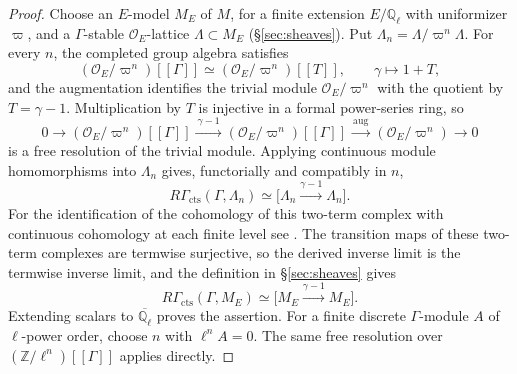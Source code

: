 \documentclass[12pt,reqno]{amsart}
\theoremstyle{definition}
\theoremstyle{plain}
\theoremstyle{definition}
\theoremstyle{remark}
\newcommand{\bbQ}{\mathbb{Q}}  \newcommand{\bbR}{\mathbb{R}}
\newcommand{\ol}[1]{\overline{#1}}
\newcommand{\Ql}{\bbQ_{\ell}}
\begin{document}
\begin{proof}
Choose an \(E\)-model \(M_E\) of \(M\), for a finite extension \(E/\mathbb Q_\ell\) with
uniformizer \(\varpi\), and a \(\Gamma\)-stable \(\mathcal O_E\)-lattice \(\Lambda\subset M_E\)
(\S\ref{sec:sheaves}).  Put \(\Lambda_n=\Lambda/\varpi^n\Lambda\).  For every \(n\), the completed
group algebra satisfies
\[
        (\mathcal O_E/\varpi^n)[[\Gamma]]\simeq(\mathcal O_E/\varpi^n)[[T]],
        \qquad \gamma\longmapsto1+T,
\]
and the augmentation identifies the trivial module \(\mathcal O_E/\varpi^n\) with the quotient by
\(T=\gamma-1\).  Multiplication by \(T\) is injective in a formal power-series ring, so
\[
 0\longrightarrow(\mathcal O_E/\varpi^n)[[\Gamma]]
 \xrightarrow{\ \gamma-1\ }(\mathcal O_E/\varpi^n)[[\Gamma]]
 \xrightarrow{\ \mathrm{aug}\ }(\mathcal O_E/\varpi^n)\longrightarrow0
\]
is a free resolution of the trivial module.  Applying continuous module homomorphisms into
\(\Lambda_n\) gives, functorially and compatibly in \(n\),
\[
        R\Gamma_{\mathrm{cts}}(\Gamma,\Lambda_n)
        \simeq
        \bigl[\Lambda_n\xrightarrow{\gamma-1}\Lambda_n\bigr].
\]
For the identification of the cohomology of this two-term complex with continuous cohomology at each
finite level see \cite[Prop.~1.7.7]{NSW2008}.
The transition maps of these two-term complexes are termwise surjective, so the derived inverse
limit is the termwise inverse limit, and the definition in \S\ref{sec:sheaves} gives
\[
        R\Gamma_{\mathrm{cts}}(\Gamma,M_E)
        \simeq
        \bigl[M_E\xrightarrow{\gamma-1}M_E\bigr].
\]
Extending scalars to \(\ol\Ql\) proves the assertion.  For a finite discrete \(\Gamma\)-module \(A\)
of \(\ell\)-power order, choose \(n\) with
\(\ell^nA=0\).  The same free resolution over \((\mathbb Z/\ell^n)[[\Gamma]]\) applies directly.
\end{proof}



\end{document}
